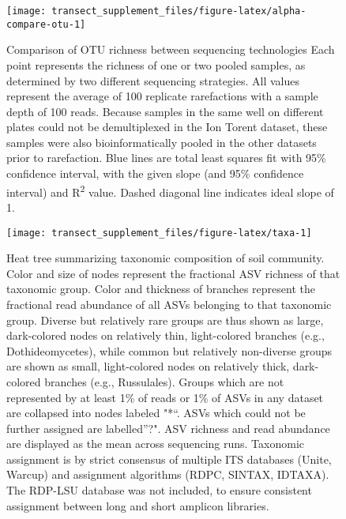\documentclass[
]{article}
\begin{document}
\begin{figure}

{\centering \texttt{[image: transect\_supplement\_files/figure-latex/alpha-compare-otu-1]} 

}

\caption[Comparison of OTU richness between sequencing technologies]{Comparison of OTU richness between sequencing technologies Each point represents the richness of one or two pooled samples, as determined by two different sequencing strategies. All values represent the average of 100 replicate rarefactions with a sample depth of 100 reads. Because samples in the same well on different plates could not be demultiplexed in the Ion Torent dataset, these samples were also bioinformatically pooled in the other datasets prior to rarefaction. Blue lines are total least squares fit with 95\% confidence interval, with the given slope (and 95\% confidence interval) and R\textsuperscript{2} value. Dashed diagonal line indicates ideal slope of 1.}\label{fig:alpha-compare-otu}
\end{figure}












\begin{sidewaysfigure}

{\centering \texttt{[image: transect\_supplement\_files/figure-latex/taxa-1]} 

}

\caption[Heat tree summarizing taxonomic composition of soil community]{Heat tree summarizing taxonomic composition of soil community. Color and size of nodes represent the fractional ASV richness of that taxonomic group.
Color and thickness of branches represent the fractional read abundance of all ASVs belonging to that taxonomic group.
Diverse but relatively rare groups are thus shown as large, dark-colored nodes on relatively thin, light-colored branches (e.g., Dothideomycetes), while common but relatively non-diverse groups are shown as small, light-colored nodes on relatively thick, dark-colored branches (e.g., Russulales).
Groups which are not represented by at least 1\% of reads or 1\% of ASVs in any dataset are collapsed into nodes labeled "*``.
ASVs which could not be further assigned are labelled''?".
ASV richness and read abundance are displayed as the mean across sequencing runs.
Taxonomic assignment is by strict consensus of multiple ITS databases (Unite, Warcup) and assignment algorithms (RDPC, SINTAX, IDTAXA).
The RDP-LSU database was not included, to ensure consistent assignment between long and short amplicon libraries.}\label{fig:taxa}
\end{sidewaysfigure}
\end{document}
